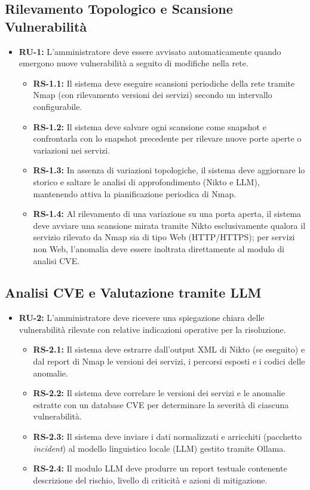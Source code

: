 \documentclass{article}
\begin{document}
\subsection{Rilevamento Topologico e Scansione Vulnerabilità}
\begin{itemize}
    \item \textbf{RU-1:} L'amministratore deve essere avvisato automaticamente quando emergono nuove vulnerabilità a seguito di modifiche nella rete.
    \begin{itemize}
        \item \textbf{RS-1.1:} Il sistema deve eseguire scansioni periodiche della rete tramite Nmap (con rilevamento versioni dei servizi) secondo un intervallo configurabile.
        \item \textbf{RS-1.2:} Il sistema deve salvare ogni scansione come snapshot e confrontarla con lo snapshot precedente per rilevare nuove porte aperte o variazioni nei servizi.
        \item \textbf{RS-1.3:} In assenza di variazioni topologiche, il sistema deve aggiornare lo storico e saltare le analisi di approfondimento (Nikto e LLM), mantenendo attiva la pianificazione periodica di Nmap.
        \item \textbf{RS-1.4:} Al rilevamento di una variazione su una porta aperta, il sistema deve avviare una scansione mirata tramite Nikto esclusivamente qualora il servizio rilevato da Nmap sia di tipo Web (HTTP/HTTPS); per servizi non Web, l'anomalia deve essere inoltrata direttamente al modulo di analisi CVE.
    \end{itemize}
\end{itemize}

\subsection{Analisi CVE e Valutazione tramite LLM}
\begin{itemize}
    \item \textbf{RU-2:} L'amministratore deve ricevere una spiegazione chiara delle vulnerabilità rilevate con relative indicazioni operative per la risoluzione.
    \begin{itemize}
        \item \textbf{RS-2.1:} Il sistema deve estrarre dall'output XML di Nikto (se eseguito) e dal report di Nmap le versioni dei servizi, i percorsi esposti e i codici delle anomalie.
        \item \textbf{RS-2.2:} Il sistema deve correlare le versioni dei servizi e le anomalie estratte con un database CVE per determinare la severità di ciascuna vulnerabilità.
        \item \textbf{RS-2.3:} Il sistema deve inviare i dati normalizzati e arricchiti (pacchetto \textit{incident}) al modello linguistico locale (LLM) gestito tramite Ollama.
        \item \textbf{RS-2.4:} Il modulo LLM deve produrre un report testuale contenente descrizione del rischio, livello di criticità e azioni di mitigazione.
    \end{itemize}
\end{itemize}
\end{document}
